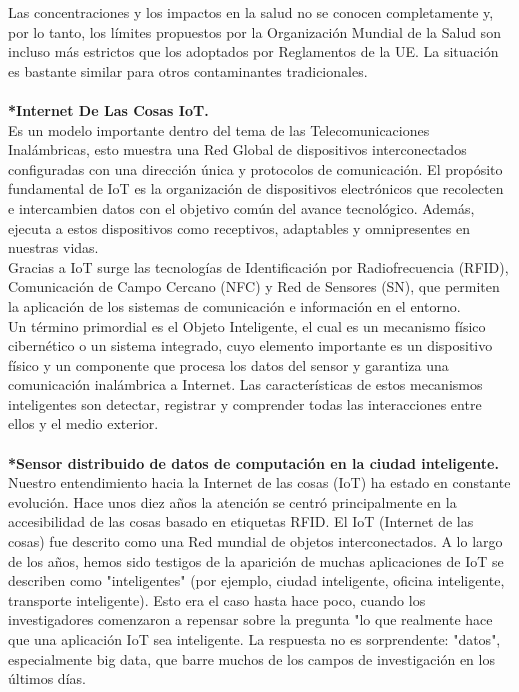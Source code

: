 \documentclass[10pt,a4paper]{article}
\begin{document}
\begin{multicols}{2}
Las concentraciones y los impactos en la salud no se conocen completamente y, por lo tanto, los límites propuestos por la Organización Mundial de la Salud son incluso más estrictos que los adoptados por Reglamentos de la UE.
La situación es bastante similar para otros contaminantes tradicionales.\\
\\
\textbf{*Internet De Las Cosas IoT.}\\
Es un modelo importante dentro del tema de las Telecomunicaciones Inalámbricas, esto muestra una Red Global de dispositivos interconectados configuradas con una dirección única y protocolos de comunicación.
El propósito fundamental de IoT es la organización de dispositivos electrónicos que recolecten e intercambien datos con el objetivo común del avance tecnológico. Además, ejecuta a estos dispositivos como receptivos, adaptables y omnipresentes en nuestras vidas.\\
Gracias a IoT surge las tecnologías de Identificación por Radiofrecuencia (RFID), Comunicación de Campo Cercano (NFC) y Red de Sensores (SN), que permiten la aplicación de los sistemas de comunicación e información en el entorno. \\
Un término primordial es el Objeto Inteligente, el cual es un mecanismo físico cibernético o un sistema integrado, cuyo elemento importante es un dispositivo físico y un componente que procesa los datos del sensor y garantiza una comunicación inalámbrica a Internet. Las características de estos mecanismos inteligentes son detectar, registrar y comprender todas las interacciones entre ellos y el medio exterior.\\
\\
\textbf{*Sensor distribuido de datos de computación en la ciudad inteligente.}\\
Nuestro entendimiento hacia la Internet de las cosas (IoT) ha estado en constante evolución. Hace unos diez años la atención se centró principalmente en la accesibilidad de las cosas basado en etiquetas RFID. 
El IoT (Internet de las cosas) fue descrito como una Red mundial de objetos interconectados. 
A lo largo de los años, hemos sido testigos de la aparición de muchas aplicaciones de IoT se describen como "inteligentes" (por ejemplo, ciudad inteligente, oficina inteligente, transporte inteligente).
Esto era el caso hasta hace poco, cuando los investigadores comenzaron a repensar sobre la pregunta "lo que realmente hace que una aplicación IoT sea inteligente.
La respuesta no es sorprendente: "datos", especialmente big data, que barre muchos de los campos de investigación en los últimos días. 

\end{multicols}
\end{document}
